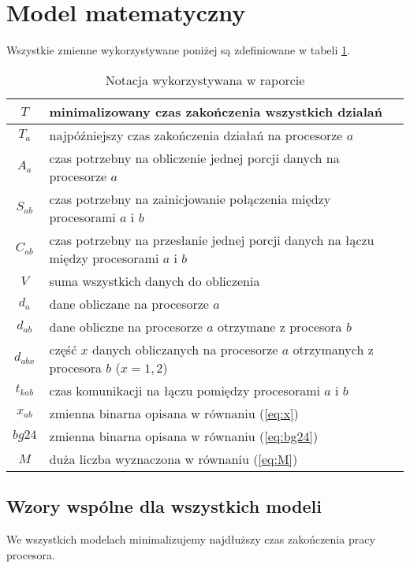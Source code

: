 
\section{Model matematyczny}

Wszystkie zmienne wykorzystywane poniżej są zdefiniowane w tabeli \ref{tab:notacja}.

\begin{table}[!ht]
\centering
\begin{tabular}{|c|l|}
\hline
$T$ & minimalizowany czas zakończenia wszystkich dzialań \\ \hline
$T_{a}$ & najpóźniejszy czas zakończenia działań na procesorze $a$ \\ \hline
$A_{a}$ & czas potrzebny na obliczenie jednej porcji danych na procesorze $a$ \\ \hline
$S_{ab}$ & czas potrzebny na zainicjowanie połączenia między procesorami $a$ i $b$ \\ \hline
$C_{ab}$ & czas potrzebny na przesłanie jednej porcji danych na łączu między procesorami $a$ i $b$ \\ \hline
$V$ & suma wszystkich danych do obliczenia \\ \hline
$d_{a}$ & dane obliczane na procesorze $a$ \\ \hline
$d_{ab}$ & dane obliczne na procesorze $a$ otrzymane z procesora $b$ \\ \hline
$d_{abx}$ & część $x$ danych obliczanych na procesorze $a$ otrzymanych z procesora $b$ ($x = 1, 2$) \\ \hline
$t_{kab}$ & czas komunikacji na łączu pomiędzy procesorami $a$ i $b$ \\ \hline
$x_{ab}$ & zmienna binarna opisana w równaniu (\ref{eq:x}) \\ \hline
$bg24$ & zmienna binarna opisana w równaniu (\ref{eq:bg24}) \\ \hline
$M$ & duża liczba wyznaczona w równaniu (\ref{eq:M}) \\ \hline
\end{tabular}
\caption{Notacja wykorzystywana w raporcie}
\label{tab:notacja}
\end{table}

\subsection{Wzory wspólne dla wszystkich modeli}

We wszystkich modelach minimalizujemy najdłuższy czas zakończenia pracy procesora.

